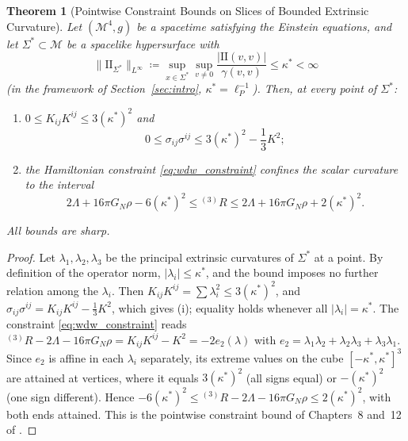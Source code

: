 \documentclass[11pt,a4paper,reqno]{amsart}
\newtheorem{theorem}{Theorem}[section]
\theoremstyle{definition}
\numberwithin{equation}{section}
\newcommand{\II}{\mathrm{I\!I}}
\begin{document}
\begin{theorem}[Pointwise Constraint Bounds on Slices of Bounded Extrinsic Curvature]
\label{thm:minimax_shear}
Let $(\mathcal{M}^4, g)$ be a spacetime satisfying the Einstein equations, and let $\Sigma^* \subset \mathcal{M}$ be a spacelike hypersurface with
\begin{equation}
    \label{eq:minimax_bound_def}
    \|\II_{\Sigma^*}\|_{L^\infty} \coloneqq \sup_{x \in \Sigma^*} \sup_{v \ne 0} \frac{|\II(v, v)|}{\gamma(v, v)} \le \kappa^* < \infty
\end{equation}
(in the framework of Section~\ref{sec:intro}, $\kappa^* = \ell_P^{-1}$). Then, at every point of $\Sigma^*$:
\begin{enumerate}[label=(\roman*)]
    \item $0 \le K_{ij}K^{ij} \le 3(\kappa^*)^2$ and
    \begin{equation}
        \label{eq:shear_bound_strict}
        0 \le \sigma_{ij}\sigma^{ij} \le 3(\kappa^*)^2 - \frac{1}{3}K^2;
    \end{equation}
    \item the Hamiltonian constraint \eqref{eq:wdw_constraint} confines the scalar curvature to the interval
    \begin{equation}
        \label{eq:curvature_interval}
        2\Lambda + 16\pi G_N\rho - 6(\kappa^*)^2 \le {}^{(3)}R \le 2\Lambda + 16\pi G_N\rho + 2(\kappa^*)^2 .
    \end{equation}
\end{enumerate}
All bounds are sharp.
\end{theorem}
\begin{proof}
Let $\lambda_1, \lambda_2, \lambda_3$ be the principal extrinsic curvatures of $\Sigma^*$ at a point. By definition of the operator norm, $|\lambda_i| \le \kappa^*$, and the bound imposes no further relation among the $\lambda_i$. Then $K_{ij}K^{ij} = \sum \lambda_i^2 \le 3(\kappa^*)^2$, and $\sigma_{ij}\sigma^{ij} = K_{ij}K^{ij} - \frac{1}{3}K^2$, which gives (i); equality holds whenever all $|\lambda_i| = \kappa^*$. The constraint \eqref{eq:wdw_constraint} reads ${}^{(3)}R - 2\Lambda - 16\pi G_N\rho = K_{ij}K^{ij} - K^2 = -2e_2(\lambda)$ with $e_2 = \lambda_1\lambda_2 + \lambda_2\lambda_3 + \lambda_3\lambda_1$. Since $e_2$ is affine in each $\lambda_i$ separately, its extreme values on the cube $[-\kappa^*, \kappa^*]^3$ are attained at vertices, where it equals $3(\kappa^*)^2$ (all signs equal) or $-(\kappa^*)^2$ (one sign different). Hence $-6(\kappa^*)^2 \le {}^{(3)}R - 2\Lambda - 16\pi G_N\rho \le 2(\kappa^*)^2$, with both ends attained. This is the pointwise constraint bound of Chapters~8 and~12 of \cite{silvafilho2026treatise}.
\end{proof}
\end{document}
